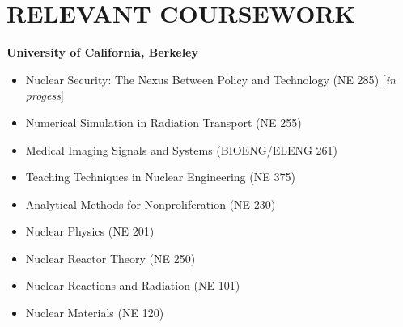\documentclass[margin, 10pt]{style/res} %
\begin{document}
\begin{resume}
\begin{thebibliography}{3}
\end{thebibliography}




\section{\small{RELEVANT COURSEWORK}}

\textbf{University of California, Berkeley}\\[-2.3ex]
\begin{itemize}[leftmargin=4ex] \itemsep -2pt
\item Nuclear Security: The Nexus Between Policy and Technology ({\footnotesize{NE 285}}) [\emph{in progess}]
\item Numerical Simulation in Radiation Transport ({\footnotesize{NE 255}})
\item Medical Imaging  Signals and Systems ({\footnotesize{BIOENG/ELENG 261}})
\item Teaching Techniques in Nuclear Engineering ({\footnotesize{NE 375}})
\item Analytical Methods for Nonproliferation ({\footnotesize{NE 230}})
\item Nuclear Physics ({\footnotesize{NE 201}})
\item Nuclear Reactor Theory ({\footnotesize{NE 250}})
\item Nuclear Reactions and Radiation ({\footnotesize{NE 101}})
\item Nuclear Materials ({\footnotesize{NE 120}})
\end{itemize}


\end{resume}
\end{document}
